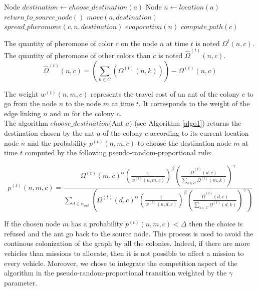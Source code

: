 \documentclass[a4paper,10pt]{article}
\begin{document}
\begin{algorithm}
\label{algo1}
\begin{algorithmic} 
\STATE Node $destination \leftarrow choose\_destination(a)$
\STATE Node $n \leftarrow location(a)$
\STATE $return\_to\_source\_node()$
\ELSE
\STATE $move(a, destination)$
\STATE $spread\_pheromone(c, n, destination)$
\ENDIF
\ENDFOR
{}
\STATE $evaporation(n)$
\ENDFOR
{}
\STATE $compute\_path(c)$
\ENDFOR
\end{algorithmic}
\end{algorithm}


The quantity of pheromone of color $c$ on the node $n$ at time $t$ is noted $\Omega^{t}(n,c)$. The quantity of pheromone of other colors than $c$ is noted $\hat \Omega^{(t)}(n,c)$.
\begin{equation*}
    \hat \Omega^{(t)}(n,c) = \left( \sum_{k \in C}(\Omega^{(t)} (n,k)) \right) - \Omega^{(t)} (n,c)
\end{equation*}

The weight $w^{(t)}(n,m,c)$ represents the travel cost of an ant of the colony $c$ to go from the node $n$ to the node $m$ at time $t$. It corresponds to the weight of the edge linking $n$ and $m$ for the colony $c$.\\

The algorithm $choose\_destination($Ant $a)$ (see Algorithm \ref{algo1}) returns the destination chosen by the ant $a$ of the colony $c$ according to its current location node $n$ and the probability $p^{(t)}(n,m,c)$ to choose the destination node $m$ at time $t$ computed by the following pseudo-random-proportional rule:

\begin{equation*}
  p^{(t)}(n,m,c) = \frac
    {
      \Omega^{(t)}(m,c)^{\alpha}
      \left( \frac{1}{w^{(t)}(n,m,c)} \right) ^{\beta}
      \left( \frac{\hat \Omega^{(t)}(d,c)}{\sum_{k \in C} \Omega^{(t)}(m,k)} \right)^{\gamma}
    }
    {
      \sum_{d \in n_{out}} \left(
	\Omega^{(t)}(d,c)^{\alpha}
	\left( \frac{1}{w^{(t)}(n,d,c)} \right)^{\beta}
	\left( \frac{\hat \Omega^{(t)}(d,c)}{\sum_{k \in C} \Omega^{(t)}(d,k)} \right)^{\gamma}
      \right)
    }
\end{equation*}

If the chosen node $m$ has a probability $p^{(t)}(n,m,c) < \Delta$ then the choice is refused and the ant go back to the source node. This process is used to avoid the continous colonization of the graph by all the colonies. Indeed, if there are more vehicles than missions to allocate, then it is not possible to affect a mission to every vehicle. Moreover, we chose to integrate the competition aspect of the algorithm in the pseudo-random-proportional transition weighted by the $\gamma$ parameter.
\end{document}
